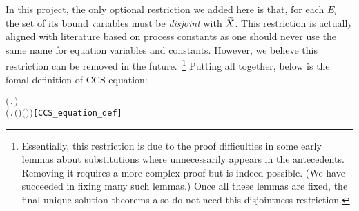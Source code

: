 In this project, the only optional restriction we added here is that, for each
$E_i$ the set of its bound variables must be \emph{disjoint} with $\widetilde
X$. This restriction is actually aligned with literature based on
process constants as one should never use the same name for equation
variables and constants. However, we believe this restriction can be
removed in the future.~\footnote{Essentially, this restriction is due
  to the proof difficulties in some early lemmas about \multivariate
  substitutions where 
  unnecessarily appears in the antecedents. Removing it requires a
  more complex proof but is indeed possible. (We have succeeded in
  fixing many such lemmas.) Once all these lemmas are
fixed, the final unique-solution theorems also do not need this
disjointness restriction.} Putting all together, below is the fomal
definition of \multivariate CCS equation:
\begin{alltt}
   \HOLTokenTurnstile{}    \HOLSymConst{\HOLTokenEquiv{}}
        \HOLSymConst{\HOLTokenConj{}}   \HOLSymConst{\ensuremath{=}}   \HOLSymConst{\HOLTokenConj{}}
       \ensuremath{(}\HOLTokenLambda{}.   \HOLSymConst{\HOLTokenSubset{}}  \ensuremath{)}  \HOLSymConst{\HOLTokenConj{}}
       \ensuremath{(}\HOLTokenLambda{}.  \ensuremath{(} \ensuremath{)} \ensuremath{(} \ensuremath{)}\ensuremath{)} \hfill{[CCS_equation_def]}
\end{alltt}

